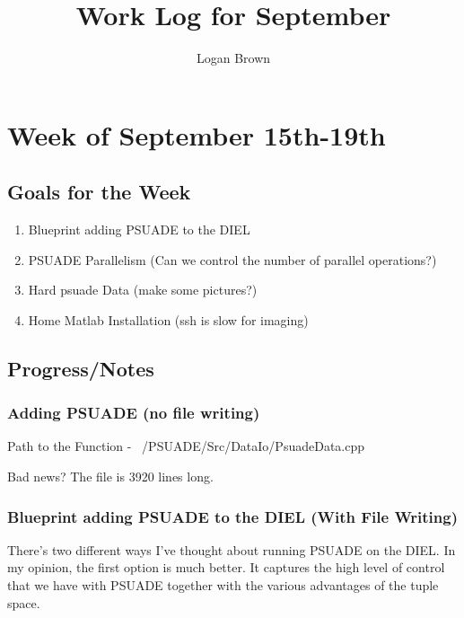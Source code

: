 \documentclass[11pt]{article} %
\title{Work Log for September}
\author{Logan Brown}
\begin{document}
\maketitle


\setcounter{section}{2} %
\setcounter{subsection}{-1}
\setcounter{subsubsection}{0}

\section{Week of September 15th-19th}
\subsection{Goals for the Week}
\begin{enumerate}
	\item Blueprint adding PSUADE to the DIEL
	\item PSUADE Parallelism (Can we control the number of parallel operations?)
	\item Hard psuade Data (make some pictures?)
	\item Home Matlab Installation (ssh is slow for imaging)
\end{enumerate}


\subsection{Progress/Notes}

\subsubsection{Adding PSUADE (no file writing)}

Path to the Function - ~/PSUADE/Src/DataIo/PsuadeData.cpp



Bad news? The file is 3920 lines long.


\subsubsection{Blueprint adding PSUADE to the DIEL (With File Writing)}

There's two different ways I've thought about running PSUADE on the DIEL. In my opinion, the first option is much better. It captures the high level of control that we have with PSUADE together with the various advantages of the tuple space.
\end{document}

